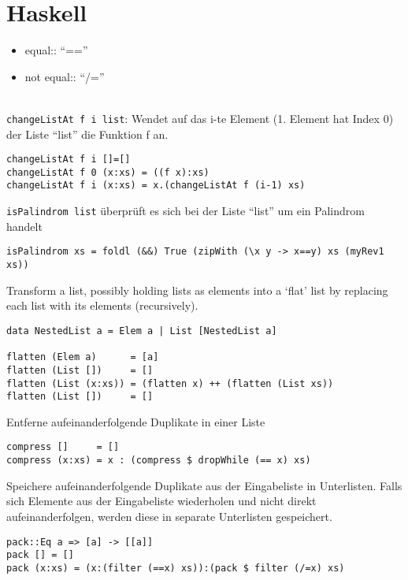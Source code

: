 \section{Haskell}
\begin{itemize}
	\item equal:: \enquote{==}
	\item not equal:: \enquote{/=}
\end{itemize}

\\
\texttt{changeListAt f i list}: Wendet auf das i-te Element (1. Element hat Index 0) der Liste \enquote{list} die Funktion f an.
\begin{lstlisting}
changeListAt f i []=[]
changeListAt f 0 (x:xs) = ((f x):xs)
changeListAt f i (x:xs) = x.(changeListAt f (i-1) xs)
\end{lstlisting}

\texttt{isPalindrom list} überprüft es sich bei der Liste \enquote{list} um ein Palindrom handelt 
\begin{lstlisting}
isPalindrom xs = foldl (&&) True (zipWith (\x y -> x==y) xs (myRev1 xs))
\end{lstlisting}

Transform a list, possibly holding lists as elements into a `flat' list by replacing each list with its elements (recursively). 
\begin{lstlisting}
data NestedList a = Elem a | List [NestedList a]

flatten (Elem a)      = [a]
flatten (List [])     = []
flatten (List (x:xs)) = (flatten x) ++ (flatten (List xs))
flatten (List [])     = []
\end{lstlisting}

Entferne aufeinanderfolgende Duplikate in einer Liste
\begin{lstlisting}
compress []     = []
compress (x:xs) = x : (compress $ dropWhile (== x) xs)
\end{lstlisting}

Speichere aufeinanderfolgende Duplikate aus der Eingabeliste in Unterlisten. Falls sich Elemente aus der Eingabeliste wiederholen und nicht direkt aufeinanderfolgen, werden diese in separate Unterlisten gespeichert.
\begin{lstlisting}
pack::Eq a => [a] -> [[a]]
pack [] = []
pack (x:xs) = (x:(filter (==x) xs)):(pack $ filter (/=x) xs)
\end{lstlisting}


